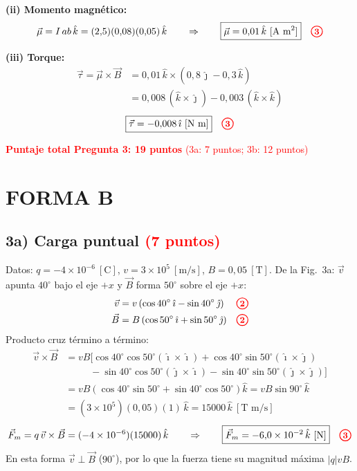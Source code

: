 \documentclass[12pt,letterpaper]{article}
\newcommand{\pts}[1]{\tikz[baseline=(c.base)]\node[circle,draw=red,text=red,thick,inner sep=1.3pt,font=\small\bfseries](c){#1};}
\begin{document}
\textbf{(ii) Momento magn\'etico:}
\[
    \vec{\mu} = I\,ab\,\hat{k} = (2{,}5)(0{,}08)(0{,}05)\,\hat{k}
    \qquad\Rightarrow\qquad
    \boxed{\vec{\mu} = 0{,}01\,\hat{k}\ [\text{A m}^2]} \quad\pts{3}
\]

\textbf{(iii) Torque:}
\begin{align*}
    \vec{\tau} = \vec{\mu}\times\vec{B} &= 0{,}01\,\hat{k}\times(0{,}8\,\hat{\jmath} - 0{,}3\,\hat{k})\\
               &= 0{,}008\,(\hat{k}\times\hat{\jmath}) - 0{,}003\,(\hat{k}\times\hat{k})
\end{align*}
\[
    \boxed{\vec{\tau} = -0{,}008\,\hat{\imath}\ [\text{N m}]} \quad\pts{3}
\]


\medskip
\noindent\textcolor{red}{\textbf{Puntaje total Pregunta 3: 19 puntos}} \textcolor{red}{(3a: 7 puntos; 3b: 12 puntos)}

\newpage
\section*{FORMA B}

\subsection*{3a) Carga puntual \quad\textcolor{red}{(7 puntos)}}

Datos: $q = -4\times10^{-6}\ [\text{C}]$, $v = 3\times10^{5}\ [\text{m/s}]$, $B = 0{,}05\ [\text{T}]$.
De la Fig.~3a: $\vec{v}$ apunta $40^\circ$ bajo el eje $+x$ y $\vec{B}$ forma $50^\circ$ sobre el eje $+x$:
\begin{align*}
    \vec{v} &= v\left(\cos40^\circ\,\hat{\imath} - \sin40^\circ\,\hat{\jmath}\right) && \pts{2}\\
    \vec{B} &= B\left(\cos50^\circ\,\hat{\imath} + \sin50^\circ\,\hat{\jmath}\right) && \pts{2}
\end{align*}
Producto cruz t\'ermino a t\'ermino:
\begin{align*}
    \vec{v}\times\vec{B}
      &= vB\bigl[\cos40^\circ\cos50^\circ(\hat{\imath}\times\hat{\imath})
         + \cos40^\circ\sin50^\circ(\hat{\imath}\times\hat{\jmath})\\
      &\qquad\;\; - \sin40^\circ\cos50^\circ(\hat{\jmath}\times\hat{\imath})
         - \sin40^\circ\sin50^\circ(\hat{\jmath}\times\hat{\jmath})\bigr]\\
      &= vB\left(\cos40^\circ\sin50^\circ + \sin40^\circ\cos50^\circ\right)\hat{k}
       = vB\sin90^\circ\,\hat{k}\\
      &= (3\times10^{5})(0{,}05)(1)\,\hat{k} = 15000\,\hat{k}\ [\text{T m/s}]
\end{align*}
\[
    \vec{F}_m = q\,\vec{v}\times\vec{B} = (-4\times10^{-6})(15000)\,\hat{k}
    \qquad\Rightarrow\qquad
    \boxed{\vec{F}_m = -6{,}0\times10^{-2}\,\hat{k}\ [\text{N}]} \quad\pts{3}
\]
En esta forma $\vec{v}\perp\vec{B}$ ($90^\circ$), por lo que la fuerza tiene su magnitud m\'axima $|q|vB$.
\end{document}
